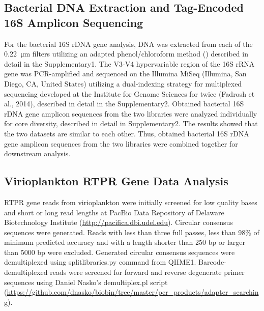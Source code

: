 \documentclass[a4,center,fleqn]{NAR}
\begin{document}
\subsection{Bacterial DNA Extraction and Tag-Encoded 16S Amplicon Sequencing}

For the bacterial 16S rDNA gene analysis, DNA was extracted from each of the \SI{0.22}{\micro\meter} filters utilizing an adapted phenol/chloroform method  (\cite{Diez2001}) described in detail in the Supplementary1.
The V3-V4 hypervariable region of the 16S rRNA gene was PCR-amplified and sequenced on the Illumina MiSeq (Illumina, San Diego, CA, United States) utilizing a dual-indexing strategy for multiplexed sequencing developed at the Institute for Genome Sciences for twice (Fadrosh et al., 2014), described in detail in the Supplementary2. 
Obtained bacterial 16S rDNA gene amplicon sequences from the two libraries were analyzed individually for core diversity, described in detail in Supplementary2.
The results showed that the two datasets are similar to each other.
Thus, obtained bacterial 16S rDNA gene amplicon sequences from the two libraries were combined together for downstream analysis.

\subsection{Virioplankton RTPR Gene Data Analysis}

RTPR gene reads from virioplankton were initially screened for low quality bases and short or long read lengths at PacBio Data Repository of Delaware Biotechnology Institute (\url{http://pacifica.dbi.udel.edu}). 
Circular consensus sequences were generated. 
Reads with less than three full passes, less than 98\% of minimum predicted accuracy and with a length shorter than 250 bp or larger than 5000 bp were excluded. 
Generated circular consensus sequences were demultiplexed using split\textunderscore libraries.py command from QIIME1. 
Barcode-demultiplexed reads were screened for forward and reverse degenerate primer sequences using Daniel Nasko’s demultiplex.pl script (\url{https://github.com/dnasko/biobin/tree/master/pcr_products/adapter_searching}). 
\end{document}
